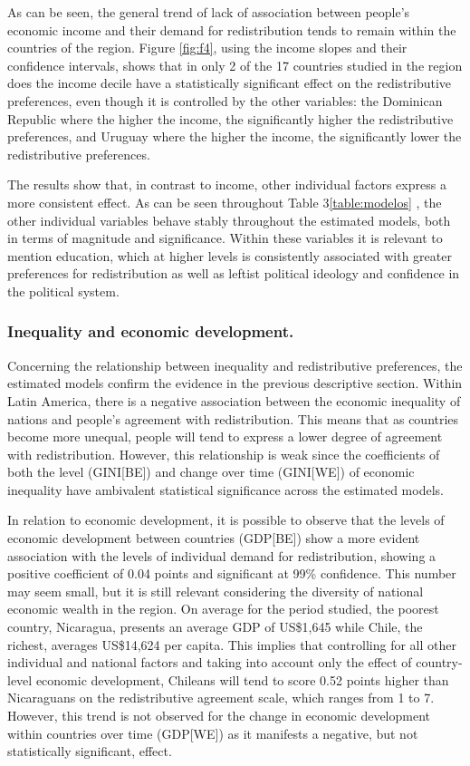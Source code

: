 \documentclass[utf8]{frontiersSCNS} %
\begin{document}
As can be seen, the general trend of lack of association between people’s economic income and their demand for redistribution tends to remain within the countries of the region. Figure \ref{fig:f4}, using the income slopes and their confidence intervals, shows that in only 2 of the 17 countries studied in the region does the income decile have a statistically significant effect on the redistributive preferences, even though it is controlled by the other variables: the Dominican Republic where the higher the income, the significantly higher the redistributive preferences, and Uruguay where the higher the income, the significantly lower the redistributive preferences.

The results show that, in contrast to income, other individual factors express a more consistent effect. As can be seen throughout Table 3\ref{table:modelos}
, the other individual variables behave stably throughout the estimated models, both in terms of magnitude and significance. Within these variables it is relevant to mention education, which at higher levels is consistently associated with greater preferences for redistribution as well as leftist political ideology and confidence in the political system.

\subsubsection{Inequality and economic development.}

Concerning the relationship between inequality and redistributive preferences, the estimated models confirm the evidence in the previous descriptive section. Within Latin America, there is a negative association between the economic inequality of nations and people’s agreement with redistribution. This means that as countries become more unequal, people will tend to express a lower degree of agreement with redistribution. However, this relationship is weak since the coefficients of both the level (GINI[BE]) and change over time (GINI[WE]) of economic inequality have ambivalent statistical significance across the estimated models.

In relation to economic development, it is possible to observe that the levels of economic development between countries (GDP[BE]) show a more evident association with the levels of individual demand for redistribution, showing a positive coefficient of 0.04 points and significant at 99\% confidence. This number may seem small, but it is still relevant considering the diversity of national economic wealth in the region. On average for the period studied, the poorest country, Nicaragua, presents an average GDP of US\$1,645 while Chile, the richest, averages US\$14,624 per capita. This implies that controlling for all other individual and national factors and taking into account only the effect of country-level economic development, Chileans will tend to score 0.52 points higher than Nicaraguans on the redistributive agreement scale, which ranges from 1 to 7. However, this trend is not observed for the change in economic development within countries over time (GDP[WE]) as it manifests a negative, but not statistically significant, effect.
\end{document}

